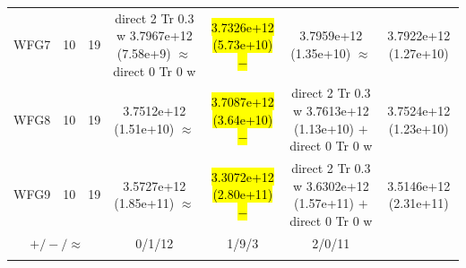 \documentclass[conference]{IEEEtran}
\newcommand{\semitextbf}[1]{%
	\pdfliteral direct {2 Tr 0.3 w} %
	#1%
	\pdfliteral direct {0 Tr 0 w}%
}
\begin{document}
\begin{table}[!t]
\begin{tabular}{ccccccc}
    \multirow{1}{*}{WFG7}&10&19&\semitextbf{3.7967e+12 (7.58e+9) $\approx$}&\hl{3.7326e+12 (5.73e+10) $-$}&3.7959e+12 (1.35e+10) $\approx$&3.7922e+12 (1.27e+10)\\
    \multirow{1}{*}{WFG8}&10&19&3.7512e+12 (1.51e+10) $\approx$&\hl{3.7087e+12 (3.64e+10) $-$}&\semitextbf{3.7613e+12 (1.13e+10) $+$}&3.7524e+12 (1.23e+10)\\
    \multirow{1}{*}{WFG9}&10&19&3.5727e+12 (1.85e+11) $\approx$&\hl{3.3072e+12 (2.80e+11) $-$}&\semitextbf{3.6302e+12 (1.57e+11) $+$}&3.5146e+12 (2.31e+11)\\
    \midrule
    \multicolumn{3}{c}{$+/-/\approx$}&0/1/12&1/9/3&2/0/11&\\
    \bottomrule
    \hspace {2em}
    \end{tabular}
\end{table}
\end{document}
